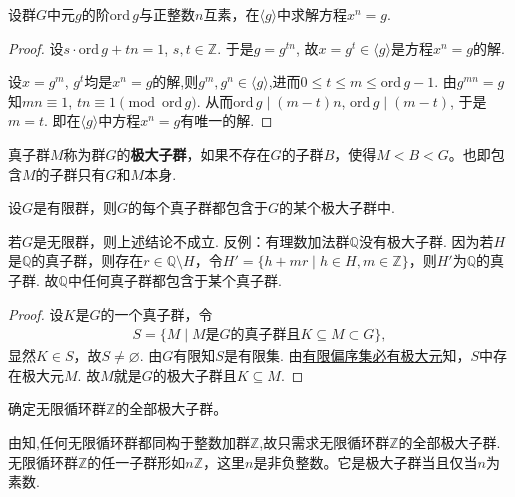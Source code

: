 \documentclass[../../main.tex]{subfiles}%
\begin{document}
\begin{example}
设群$G$中元$g$的阶$\mathrm{ord}\,g$与正整数$n$互素，在$\langle g\rangle$中求解方程$x^n = g$.
\end{example}
\begin{proof}

设$s\cdot \mathrm{ord}\,g + t n = 1$, $s,t\in\mathbb{Z}$. 于是$g = g^{t n}$, 故$x = g^t \in \langle g\rangle$是方程$x^n = g$的解.

设$x = g^m$, $g^t$均是$x^n = g$的解,则$g^m,g^n\in \langle g\rangle$,进而$0\leqslant t\leqslant m\leqslant \mathrm{ord}\,g-1$. 由$g^{m n} = g$知$m n \equiv 1$, $t n \equiv 1 \pmod{\mathrm{ord}\,g}$. 从而$\mathrm{ord}\,g\mid (m-t)n$, $\mathrm{ord}\,g\mid (m-t)$, 于是$m = t$. 即在$\langle g\rangle$中方程$x^n = g$有唯一的解.
\end{proof}

\begin{definition}[极大子群]
真子群$M$称为群$G$的\textbf{极大子群}，如果不存在$G$的子群$B$，使得$M < B < G$。也即包含$M$的子群只有$G$和$M$本身.
\end{definition}

\begin{theorem}\label{theorem:有限群的每个真子群必包含于某个极大子群中}
设$G$是有限群，则$G$的每个真子群都包含于$G$的某个极大子群中.
\end{theorem}
\begin{remark}
若$G$是无限群，则上述结论不成立. 反例：有理数加法群$\mathbb{Q}$没有极大子群.
因为若$H$是$\mathbb{Q}$的真子群，则存在$r\in\mathbb{Q}\setminus H$，令$H'=\{ h+mr\mid h\in H,m\in\mathbb{Z} \}$，则$H'$为$\mathbb{Q}$的真子群. 故$\mathbb{Q}$中任何真子群都包含于某个真子群.
\end{remark}
\begin{proof}
设$K$是$G$的一个真子群，令
\begin{align*}
S=\{ M\mid M\text{是}G\text{的真子群且}K\subseteq M\subset G \},
\end{align*}
显然$K\in S$，故$S\neq\varnothing$. 由$G$有限知$S$是有限集. 由\hyperref[Set Theorem-theorem:有限偏序集必有极大元]{有限偏序集必有极大元}知，$S$中存在极大元$M$. 故$M$就是$G$的极大子群且$K\subseteq M$.
\end{proof}

\begin{example}
确定无限循环群$\mathbb{Z}$的全部极大子群。
\end{example}
\begin{solution}
由知,任何无限循环群都同构于整数加群$\mathbb{Z}$,故只需求无限循环群$\mathbb{Z}$的全部极大子群.无限循环群$\mathbb{Z}$的任一子群形如$n\mathbb{Z}$，这里$n$是非负整数。它是极大子群当且仅当$n$为素数.

\end{solution}
\end{document}
